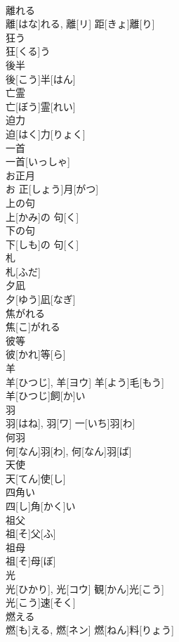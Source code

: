 \documentclass[8pt]{extreport}
\begin{document}
\begin{CJK}{UTF8}{min}
\\	離れる	
\\	離[はな]れる, 離[リ]	距[きょ]離[り] 
\\	狂う	
\\	狂[くる]う	
\\	後半	
\\	後[こう]半[はん]	
\\	亡霊	
\\	亡[ぼう]霊[れい]	
\\	迫力	
\\	迫[はく]力[りょく]	
\\	一首	
\\	一首[いっしゃ]	
\\	お正月	
\\	お 正[しょう]月[がつ]	
\\	上の句	
\\	上[かみ]の 句[く]	
\\	下の句	
\\	下[しも]の 句[く]	
\\	札	
\\	札[ふだ]	
\\	夕凪	
\\	夕[ゆう]凪[なぎ]	
\\	焦がれる	
\\	焦[こ]がれる	
\\	彼等	
\\	彼[かれ]等[ら]	
\\	羊	
\\	羊[ひつじ], 羊[ヨウ]	羊[よう]毛[もう] 
\\	羊[ひつじ]飼[か]い 
\\	羽	
\\	羽[はね], 羽[ワ]	一[いち]羽[わ] 
\\	何羽	
\\	何[なん]羽[わ], 何[なん]羽[ば]	
\\	天使	
\\	天[てん]使[し]	
\\	四角い	
\\	四[し]角[かく]い	
\\	祖父	
\\	祖[そ]父[ふ]	
\\	祖母	
\\	祖[そ]母[ぼ]	
\\	光	
\\	光[ひかり], 光[コウ]	観[かん]光[こう] 
\\	光[こう]速[そく] 
\\	燃える	
\\	燃[も]える, 燃[ネン]	燃[ねん]料[りょう] 

\end{CJK}
\end{document}
